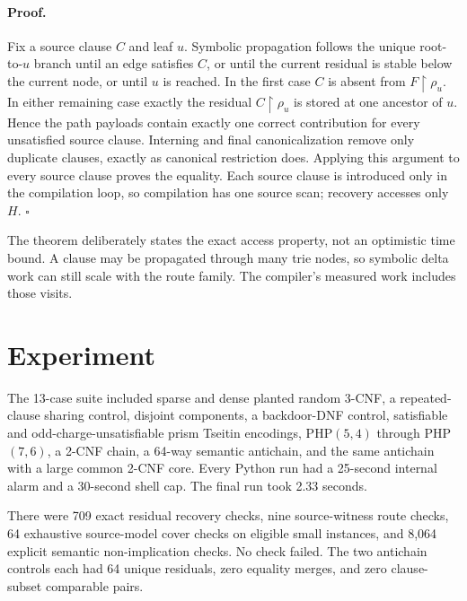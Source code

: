 \documentclass[11pt]{article}
\newcommand{\res}{\mathbin{\upharpoonright}}
\begin{document}
\paragraph{Proof.}
Fix a source clause $C$ and leaf $u$.  Symbolic propagation follows the unique
root-to-$u$ branch until an edge satisfies $C$, or until the current residual
is stable below the current node, or until $u$ is reached.  In the first case
$C$ is absent from $F\res\rho_u$.  In either remaining case exactly the
residual $C\res\rho_u$ is stored at one ancestor of $u$.  Hence the path
payloads contain exactly one correct contribution for every unsatisfied
source clause.  Interning and final canonicalization remove only duplicate
clauses, exactly as canonical restriction does.  Applying this argument to
every source clause proves the equality.  Each source clause is introduced
only in the compilation loop, so compilation has one source scan; recovery
accesses only $H$.  \hfill$\square$

The theorem deliberately states the exact access property, not an optimistic
time bound.  A clause may be propagated through many trie nodes, so symbolic
delta work can still scale with the route family.  The compiler's measured
work includes those visits.

\section{Experiment}

The 13-case suite included sparse and dense planted random 3-CNF, a
repeated-clause sharing control, disjoint components, a backdoor-DNF control, satisfiable
and odd-charge-unsatisfiable prism Tseitin encodings, PHP$(5,4)$ through
PHP$(7,6)$, a 2-CNF chain, a 64-way semantic antichain, and the same antichain
with a large common 2-CNF core.  Every Python run had a 25-second internal
alarm and a 30-second shell cap.  The final run took 2.33 seconds.

There were 709 exact residual recovery checks, nine source-witness route
checks, 64 exhaustive source-model cover checks on eligible small instances,
and 8,064 explicit semantic non-implication checks.  No check failed.  The
two antichain controls each had 64 unique residuals, zero equality merges,
and zero clause-subset comparable pairs.
\end{document}
